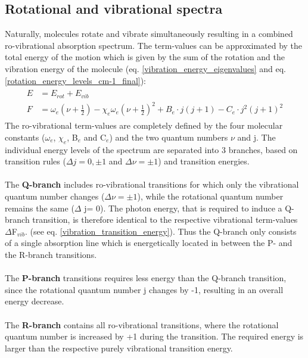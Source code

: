 \subsection{Rotational and vibrational spectra}
Naturally, molecules rotate and vibrate simultaneously resulting in a combined ro-vibrational absorption spectrum. The term-values can be approximated by the total energy of the motion which is given by the sum of the rotation and the vibration energy of the molecule (eq. \ref{vibration_energy_eigenvalues} and eq. \ref{rotation_energy_levels_cm-1_final}):
\begin{align}
\begin{split}
	E &= E_{rot} + E_{vib} \\
	F &= \omega_e (\nu +\frac{1}{2}) - \chi_e \omega_e (\nu +\frac{1}{2})^2 + B_e \cdot j(j+1) -  C_e \cdot j^2(j+1)^2 
\label{term-values-rovibration-spectrum}
\end{split}
\end{align}
The ro-vibrational term-values are completely defined by the four molecular constants ($\omega_e$, $\chi_e$, B$_e$ and C$_e$) and the two quantum numbers $\nu$ and j. The individual energy levels of the spectrum are separated into 3 branches, based on transition rules ($\Delta j =0, \pm1 $ and $\Delta \nu =\pm1 $) and transition energies.\\ \\
The \textbf{Q-branch} includes ro-vibrational transitions for which only the vibrational quantum number changes ($\Delta \nu = \pm 1$), while the rotational quantum number remains the same ($\Delta$ j= 0). The photon energy, that is required to induce a Q-branch transition, is therefore identical to the respective vibrational term-values $\Delta$F$_{vib}$. (see eq. \ref{vibration_transition_energy}). Thus the Q-branch only consists of a single absorption line which is energetically located in between the P- and the R-branch transitions.\\ \\
The \textbf{P-branch} transitions requires less energy than the Q-branch transition, since the rotational quantum number j changes by -1, resulting in an overall energy decrease. 
\\ \\The \textbf{R-branch} contains all ro-vibrational transitions, where the rotational quantum number is increased by +1 during the transition. The required energy is larger than the respective purely vibrational transition energy. \\\\ 
